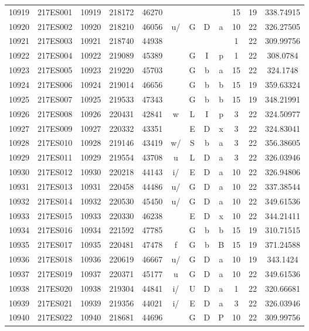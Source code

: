 \begin{tabular}{|*{12}{c|}}
10919 & 217ES001 & 10919 & 218172 & 46270 &  &  &  &  & 15 & 19 & 338.74915 \\ 
10920 & 217ES002 & 10920 & 218210 & 46056 & u/ & G & D & a & 10 & 22 & 326.27505 \\ 
10921 & 217ES003 & 10921 & 218740 & 44938 &  &  &  &  & 1 & 22 & 309.99756 \\ 
10922 & 217ES004 & 10922 & 219089 & 45389 &  & G & I & p & 1 & 22 & 308.0784 \\ 
10923 & 217ES005 & 10923 & 219220 & 45703 &  & G & b & a & 15 & 22 & 324.1748 \\ 
10924 & 217ES006 & 10924 & 219014 & 46656 &  & G & b & b & 15 & 19 & 359.63324 \\ 
10925 & 217ES007 & 10925 & 219533 & 47343 &  & G & b & b & 15 & 19 & 348.21991 \\ 
10926 & 217ES008 & 10926 & 220431 & 42841 & w & L & I & p & 3 & 22 & 324.50977 \\ 
10927 & 217ES009 & 10927 & 220332 & 43351 &  & E & D & x & 3 & 22 & 324.83041 \\ 
10928 & 217ES010 & 10928 & 219146 & 43419 & w/ & S & b & a & 3 & 22 & 356.38605 \\ 
10929 & 217ES011 & 10929 & 219554 & 43708 & u & L & D & a & 3 & 22 & 326.03946 \\ 
10930 & 217ES012 & 10930 & 220218 & 44143 & i/ & E & D & a & 10 & 22 & 326.94806 \\ 
10931 & 217ES013 & 10931 & 220458 & 44486 & u/ & G & D & a & 10 & 22 & 337.38544 \\ 
10932 & 217ES014 & 10932 & 220530 & 45450 & u/ & G & D & a & 10 & 22 & 349.61536 \\ 
10933 & 217ES015 & 10933 & 220330 & 46238 &  & E & D & x & 10 & 22 & 344.21411 \\ 
10934 & 217ES016 & 10934 & 221592 & 47785 &  & G & b & b & 15 & 19 & 310.71515 \\ 
10935 & 217ES017 & 10935 & 220481 & 47478 & f & G & b & B & 15 & 19 & 371.24588 \\ 
10936 & 217ES018 & 10936 & 220619 & 46667 & u/ & G & D & a & 10 & 19 & 343.1424 \\ 
10937 & 217ES019 & 10937 & 220371 & 45177 & u & G & D & a & 10 & 22 & 349.61536 \\ 
10938 & 217ES020 & 10938 & 219304 & 44841 & i/ & U & D & a & 1 & 22 & 320.66681 \\ 
10939 & 217ES021 & 10939 & 219356 & 44021 & i/ & E & D & a & 3 & 22 & 326.03946 \\ 
10940 & 217ES022 & 10940 & 218681 & 44696 &  & G & D & P & 10 & 22 & 309.99756 \\ 

\end{tabular}
